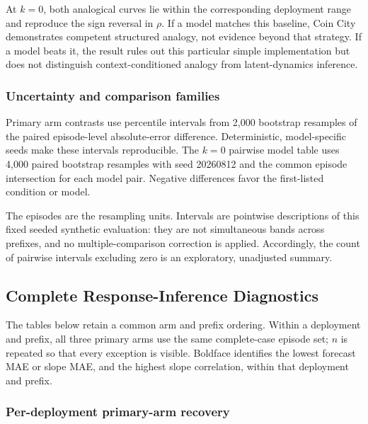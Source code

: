 At $k=0$, both analogical curves lie within the corresponding deployment range
and reproduce the sign reversal in $\rho$. If a model matches this baseline, Coin
City demonstrates competent structured analogy, not evidence beyond that strategy.
If a model beats it, the result rules out this particular simple implementation
but does not distinguish context-conditioned analogy from latent-dynamics inference.


\subsubsection{Uncertainty and comparison families}
Primary arm contrasts use percentile intervals from 2,000 bootstrap resamples of
the paired episode-level absolute-error difference. Deterministic, model-specific
seeds make these intervals reproducible. The \(k=0\) pairwise model table uses
4,000 paired bootstrap resamples with seed 20260812 and the common episode
intersection for each model pair. Negative differences favor the first-listed
condition or model.

The episodes are the resampling units. Intervals are pointwise descriptions of
this fixed seeded synthetic evaluation: they are not simultaneous bands across
prefixes, and no multiple-comparison correction is applied. Accordingly, the
count of pairwise intervals excluding zero is an exploratory, unadjusted summary.

\subsection{Complete Response-Inference Diagnostics}
\label{app:coin-city-results}

The tables below retain a common arm and prefix ordering. Within a deployment and
prefix, all three primary arms use the same complete-case episode set; \(n\) is
repeated so that every exception is visible. Boldface identifies the lowest
forecast MAE or slope MAE, and the highest slope correlation, within that
deployment and prefix.

\subsubsection{Per-deployment primary-arm recovery}

